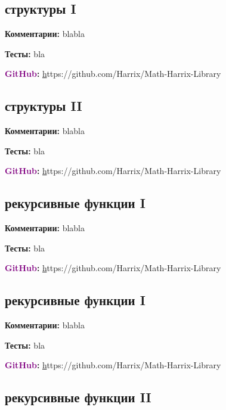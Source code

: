 \documentclass[a4paper,,titlepage]{report}
\newcommand{\gitlink}[1]{\textsf{\textbf {\textcolor{purple}{GitHub}:  }}\selectfont \href{}#1\par}
\newcommand{\comments}[1]{\textsf{\textbf {Комментарии:  }}#1\par}
\newcommand{\tests}[1]{\textsf{\textbf {Тесты:  }}#1\par}
\begin{document}
\begin{center}\section{структуры I}\end{center}
 
 \begin{flushleft}
\comments{bla\newline bla}
\tests{bla} 
\gitlink{https://github.com/Harrix/Math-Harrix-Library}
\end{flushleft}

 
\begin{center}\section{структуры II}\end{center}
 
 \begin{flushleft}
\comments{bla\newline bla}
\tests{bla} 
\gitlink{https://github.com/Harrix/Math-Harrix-Library}
\end{flushleft}


\begin{center}\section{рекурсивные функции I}\end{center}
 
 \begin{flushleft}
\comments{bla\newline bla}
\tests{bla} 
\gitlink{https://github.com/Harrix/Math-Harrix-Library}
\end{flushleft}


\begin{center}\section{рекурсивные функции I}\end{center}
 
 \begin{flushleft}
\comments{bla\newline bla}
\tests{bla} 
\gitlink{https://github.com/Harrix/Math-Harrix-Library}
\end{flushleft}

\begin{center}\section{рекурсивные функции II}\end{center}
 
\end{document}

